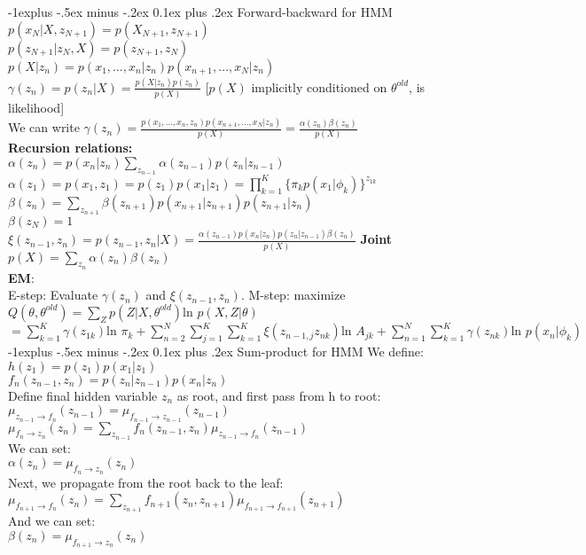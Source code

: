 \documentclass[9pt,landscape]{article}
\makeatletter
\renewcommand{\subsection}{\@startsection{subsection}{2}{0mm}%
                                {-1explus -.5ex minus -.2ex}%
                                {0.1ex plus .2ex}%
                                {\normalfont\scriptsize\bfseries}}
\makeatother
\begin{document}
\begin{multicols}{3}
\subsection{Forward-backward for HMM}
$p(x_N|X,z_{N+1}) = p(X_{N+1}, z_{N+1})$\\
$p(z_{N+1}|z_N,X) = p(z_{N+1}, z_N)$ \\
$p(X|z_n) = p(x_1, \ldots, x_n|z_n)p(x_{n+1},\ldots,x_N|z_n)$ \\
$\gamma(z_n) = p(z_n|X) = \frac{p(X|z_n)p(z_n)}{p(X)}$ [$p(X)$ implicitly conditioned on $\theta^{old}$, is likelihood]\\
We can write $\gamma(z_n)=\frac{p(x_1,\ldots,x_n,z_n)p(x_{n+1},\ldots,x_N|z_n)}{p(X)} = \frac{\alpha(z_n)\beta(z_n)}{p(X)}$\\
\textbf{Recursion relations:}\\
$\alpha(z_n) = p(x_n|z_n)\sum_{z_{n-1}} \alpha(z_{n-1})p(z_n|z_{n-1})$\\
$\alpha(z_1) = p(x_1,z_1) = p(z_1)p(x_1|z_1) = \prod^K_{k=1} \{\pi_kp(x_1|\phi_k)\}^{z_{1k}}$\\
$\beta(z_n) = \sum_{z_{n+1}} \beta(z_{n+1})p(x_{n+1}|z_{n+1})p(z_{n+1}|z_n)$\\
$\beta(z_N) = 1 $\\
$\xi(z_{n-1},z_n) = p(z_{n-1},z_n|X) = \frac{\alpha(z_{n-1})p(x_n|z_n)p(z_n|z_{n-1})\beta(z_n)}{p(X)}$
\textbf{Joint}\\
$p(X) = \sum_{z_n}\alpha(z_n)\beta(z_n)$\\
\textbf{EM}:\\
E-step: Evaluate $\gamma(z_n)$ and $\xi(z_{n-1},z_n)$. M-step: maximize $Q(\theta,\theta^{old}) = \sum_Z p(Z|X,\theta^{old}) \text{ln } p(X,Z|\theta)$
$= \sum^K_{k=1} \gamma(z_{1k}) \text{ln }\pi_k + \sum^N_{n=2}\sum^K_{j=1}\sum^K_{k=1} \xi(z_{n-1,j}z_{nk})\text{ln }A_{jk} + \sum^N_{n=1}\sum^K_{k=1}\gamma(z_{nk})\text{ln } p(x_n|\phi_k)$
\subsection{Sum-product for HMM}
We define:\\
$h(z_1) = p(z_1)p(x_1|z_1)$\\
$f_n(z_{n-1},z_n) = p(z_n|z_{n-1})p(x_n|z_n)$\\
Define final hidden variable $z_n$ as root, and first pass from h to root:\\
$\mu_{z_{n-1}\rightarrow f_n}(z_{n-1}) = \mu_{f_{n-1}\rightarrow z_{n-1}}(z_{n-1})$\\
$\mu_{f_n\rightarrow z_n}(z_n) = \sum_{z_{n-1}}f_n(z_{n-1},z_n) \mu_{z_{n-1} \rightarrow f_n}(z_{n-1})$\\
We can set:\\
$\alpha(z_n) = \mu_{f_n\rightarrow z_n}(z_n)$\\
Next, we propagate from the root back to the leaf:\\
$\mu_{f_{n+1}\rightarrow f_n}(z_n) = \sum_{z_{n+1}} f_{n+1}(z_n,z_{n+1}) \mu_{f_{n+1}\rightarrow f_{n+1}}(z_{n+1})$\\
And we can set:\\
$\beta(z_n) = \mu_{f_{n+1}\rightarrow z_n}(z_n)$

\end{multicols}
\end{document}
